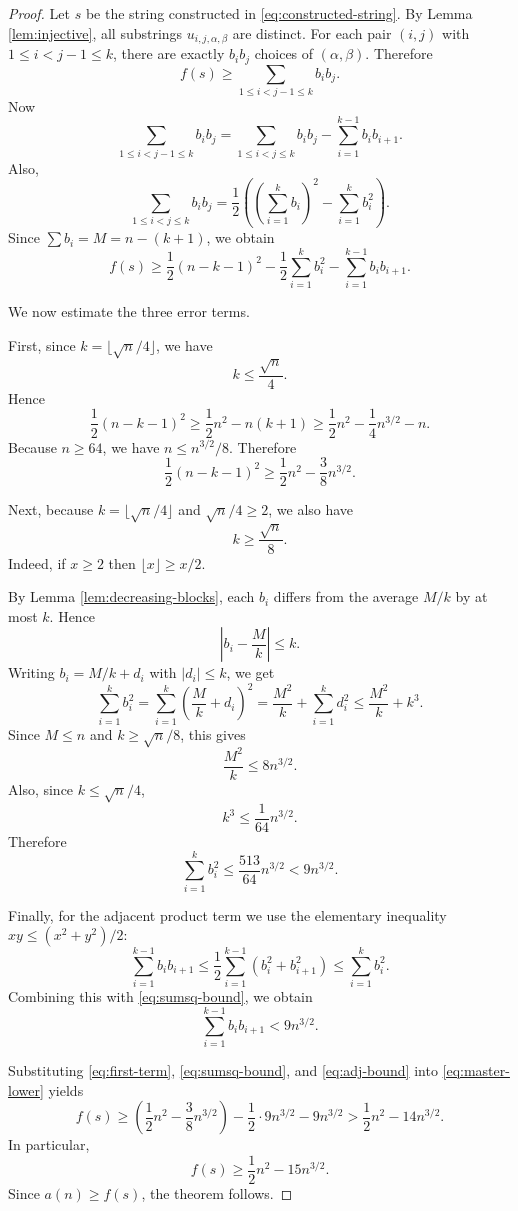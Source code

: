 \documentclass[11pt]{article}
\begin{document}
\begin{proof}
Let $s$ be the string constructed in \eqref{eq:constructed-string}.  By Lemma \ref{lem:injective}, all substrings $u_{i,j,\alpha,\beta}$ are distinct.  For each pair $(i,j)$ with $1\le i<j-1\le k$, there are exactly $b_i b_j$ choices of $(\alpha,\beta)$.  Therefore
\[
f(s)\ge \sum_{1\le i<j-1\le k} b_i b_j.
\]
Now
\[
\sum_{1\le i<j-1\le k} b_i b_j
=
\sum_{1\le i<j\le k} b_i b_j
-
\sum_{i=1}^{k-1} b_i b_{i+1}.
\]
Also,
\[
\sum_{1\le i<j\le k} b_i b_j
=
\frac12\left(\left(\sum_{i=1}^k b_i\right)^2-\sum_{i=1}^k b_i^2\right).
\]
Since $\sum b_i=M=n-(k+1)$, we obtain
\begin{equation}\label{eq:master-lower}
f(s)
\ge
\frac12 (n-k-1)^2
-
\frac12\sum_{i=1}^k b_i^2
-
\sum_{i=1}^{k-1} b_i b_{i+1}.
\end{equation}

We now estimate the three error terms.

First, since $k=\lfloor \sqrt n/4\rfloor$, we have
\[
k\le \frac{\sqrt n}{4}.
\]
Hence
\[
\frac12 (n-k-1)^2
\ge
\frac12 n^2-n(k+1)
\ge
\frac12 n^2-\frac14 n^{3/2}-n.
\]
Because $n\ge 64$, we have $n\le n^{3/2}/8$.  Therefore
\begin{equation}\label{eq:first-term}
\frac12 (n-k-1)^2
\ge
\frac12 n^2-\frac38 n^{3/2}.
\end{equation}

Next, because $k=\lfloor \sqrt n/4\rfloor$ and $\sqrt n/4\ge 2$, we also have
\[
k\ge \frac{\sqrt n}{8}.
\]
Indeed, if $x\ge 2$ then $\lfloor x\rfloor\ge x/2$.

By Lemma \ref{lem:decreasing-blocks}, each $b_i$ differs from the average $M/k$ by at most $k$.  Hence
\[
\left|b_i-\frac{M}{k}\right|\le k.
\]
Writing $b_i=M/k+d_i$ with $|d_i|\le k$, we get
\[
\sum_{i=1}^k b_i^2
=
\sum_{i=1}^k \left(\frac{M}{k}+d_i\right)^2
=
\frac{M^2}{k}+\sum_{i=1}^k d_i^2
\le
\frac{M^2}{k}+k^3.
\]
Since $M\le n$ and $k\ge \sqrt n/8$, this gives
\[
\frac{M^2}{k}\le 8n^{3/2}.
\]
Also, since $k\le \sqrt n/4$,
\[
k^3\le \frac{1}{64}n^{3/2}.
\]
Therefore
\begin{equation}\label{eq:sumsq-bound}
\sum_{i=1}^k b_i^2\le \frac{513}{64}n^{3/2}<9n^{3/2}.
\end{equation}

Finally, for the adjacent product term we use the elementary inequality $xy\le (x^2+y^2)/2$:
\[
\sum_{i=1}^{k-1} b_i b_{i+1}
\le
\frac12 \sum_{i=1}^{k-1}(b_i^2+b_{i+1}^2)
\le
\sum_{i=1}^k b_i^2.
\]
Combining this with \eqref{eq:sumsq-bound}, we obtain
\begin{equation}\label{eq:adj-bound}
\sum_{i=1}^{k-1} b_i b_{i+1}<9n^{3/2}.
\end{equation}

Substituting \eqref{eq:first-term}, \eqref{eq:sumsq-bound}, and \eqref{eq:adj-bound} into \eqref{eq:master-lower} yields
\[
f(s)
\ge
\left(\frac12 n^2-\frac38 n^{3/2}\right)-\frac12\cdot 9n^{3/2}-9n^{3/2}
>
\frac12 n^2-14n^{3/2}.
\]
In particular,
\[
f(s)\ge \frac12 n^2-15n^{3/2}.
\]
Since $a(n)\ge f(s)$, the theorem follows.
\end{proof}
\end{document}
